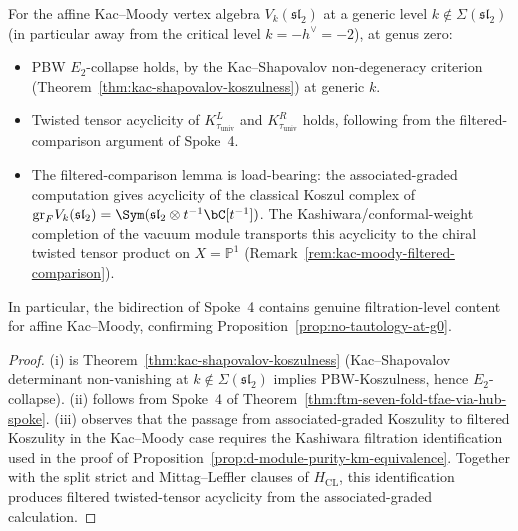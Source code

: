 \begin{proposition}
\label{prop:class-L-witness}
For the affine Kac--Moody vertex algebra $V_k(\mathfrak{sl}_2)$ at a
generic level $k\notin\Sigma(\mathfrak{sl}_2)$
\textup{(}in particular away from the critical level
$k=-h^\vee=-2$\textup{)}, at genus zero:
\begin{itemize}
\item[\textup{(i)}] PBW $E_2$-collapse holds, by the Kac--Shapovalov
non-degeneracy criterion
(Theorem~\ref{thm:kac-shapovalov-koszulness}) at generic $k$.
\item[\textup{(ii)}] Twisted tensor acyclicity of
$K_{\tau_{\mathrm{univ}}}^L$ and $K_{\tau_{\mathrm{univ}}}^R$ holds,
following from the filtered-comparison argument of Spoke~4.
\item[\textup{(iii)}] The filtered-comparison lemma is load-bearing:
the associated-graded computation gives acyclicity of the
classical Koszul complex of $\mathrm{gr}_F V_k(\mathfrak{sl}_2) =
\Sym(\mathfrak{sl}_2\otimes t^{-1}\bC[t^{-1}])$.  The
Kashiwara/conformal-weight completion of the vacuum module transports
this acyclicity to the chiral twisted tensor product on
$X=\mathbb P^1$
\textup{(}Remark~\ref{rem:kac-moody-filtered-comparison}\textup{)}.
\end{itemize}
In particular, the bidirection of Spoke~4 contains genuine
filtration-level content for affine Kac--Moody, confirming
Proposition~\ref{prop:no-tautology-at-g0}.
\end{proposition}

\begin{proof}
(i) is Theorem~\ref{thm:kac-shapovalov-koszulness}
(Kac--Shapovalov determinant non-vanishing at
$k\notin\Sigma(\mathfrak{sl}_2)$ implies PBW-Koszulness, hence
$E_2$-collapse). (ii) follows from Spoke~4 of
Theorem~\ref{thm:ftm-seven-fold-tfae-via-hub-spoke}. (iii) observes
that the passage from associated-graded Koszulity to filtered
Koszulity in the Kac--Moody case requires the Kashiwara filtration
identification used in the proof of
Proposition~\ref{prop:d-module-purity-km-equivalence}.  Together with
the split strict and Mittag--Leffler clauses of $H_{\mathrm{CL}}$, this
identification produces filtered twisted-tensor acyclicity from the
associated-graded calculation.
\end{proof}

